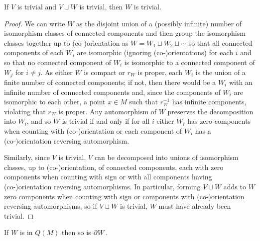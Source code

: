 \begin{lemma}\label{L: Lip L10}
	If $V$ is trivial and $V \sqcup W$ is trivial, then $W$ is trivial.
\end{lemma}

\begin{proof}
	We can write $W$ as the disjoint union of a (possibly infinite) number of isomorphism classes of connected components and then group the isomorphism classes together up to (co-)orientation as $W = W_1 \sqcup W_2 \sqcup \cdots$ so that all connected components of each $W_i$ are isomorphic (ignoring (co-)orientations) for each $i$ and so that no connected component of $W_i$ is isomorphic to a connected component of $W_j$ for $i\neq j$.
	As either $W$ is compact or $r_W$ is proper, each $W_i$ is the union of a finite number of connected components; if not, then there would be a $W_i$ with an infinite number of connected components and, since the components of $W_i$ are isomorphic to each other, a point $x\in M$ such that $r_W^{-1}$ has infinite components, violating that $r_W$ is proper. 
	Any automorphism of $W$ preserves the decomposition into $W_i$, and so $W$ is trivial if and only if for all $i$ either $W_i$ has zero components when counting with (co-)orientation or each component of $W_i$ has a (co-)orientation reversing automorphism.

	Similarly, since $V$ is trivial, $V$ can be decomposed into unions of isomorphism classes, up to (co-)orienta\-tion, of connected components, each with zero components when counting with sign or with all components having (co-)orientation reversing automorphisms.
	In particular, forming $V \sqcup W$ adds to $W$ zero components when counting with sign or components with (co-)orientation reversing automorphisms, so if $V \sqcup W$ is trivial, $W$ must have already been trivial.
\end{proof}

\begin{lemma}\label{L: bd defined}
	If $W$ is in $Q(M)$ then so is $\partial W$.
\end{lemma}

